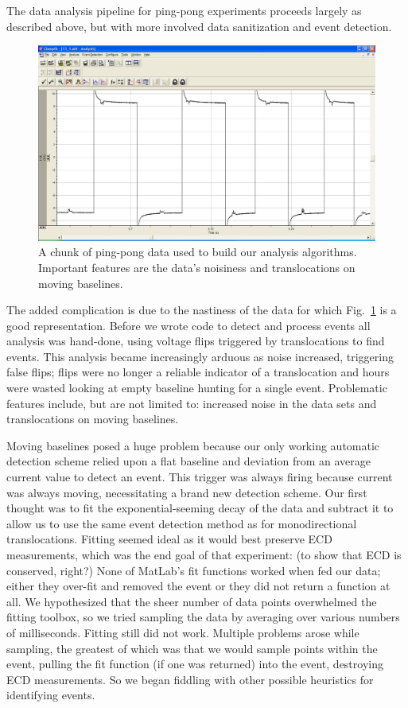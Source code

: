 \documentclass[aps,prl,preprint,groupedaddress]{revtex4}
\begin{document}
The data analysis pipeline for ping-pong experiments proceeds largely as described above, but with more involved data sanitization and event detection.
\begin{figure}
\centering
\includegraphics[width=1\textwidth]{figures/good-ping-pong}
\caption{A chunk of ping-pong data used to build our analysis algorithms.
Important features are the data's noisiness and translocations on moving baselines.}
\label{fig:good-ping-pong}
\end{figure}
The added complication is due to the nastiness of the data for which Fig.~\ref{fig:good-ping-pong} is a good representation.
Before we wrote code to detect and process events all analysis was hand-done, using voltage flips triggered by translocations to find events.
This analysis became increasingly arduous as noise increased, triggering false flips; flips were no longer a reliable indicator of a translocation and hours were wasted looking at empty baseline hunting for a single event.
Problematic features include, but are not limited to: increased noise in the data sets and translocations on moving baselines.

Moving baselines posed a huge problem because our only working automatic detection scheme relied upon a flat baseline and deviation from an average current value to detect an event.
This trigger was always firing because current was always moving, necessitating a brand new detection scheme.
Our first thought was to fit the exponential-seeming decay of the data and subtract it to allow us to use the same event detection method as for monodirectional translocations.
Fitting seemed ideal as it would best preserve ECD measurements, which was the end goal of that experiment: (to show that ECD is conserved, right?)
None of MatLab's fit functions worked when fed our data; either they over-fit and removed the event or they did not return a function at all.
We hypothesized that the sheer number of data points overwhelmed the fitting toolbox, so we tried sampling the data by averaging over various numbers of milliseconds.
Fitting still did not work.
Multiple problems arose while sampling, the greatest of which was that we would sample points within the event, pulling the fit function (if one was returned) into the event, destroying ECD measurements.
So we began fiddling with other possible heuristics for identifying events.
\end{document}
